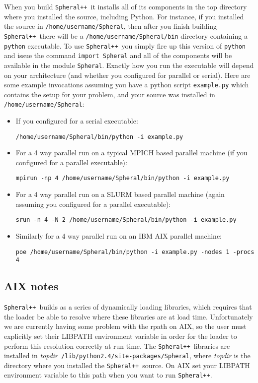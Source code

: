\documentclass{article}
\newcommand{\Spheral}{{\tt Spheral++}}
\begin{document}
When you build \Spheral\ it installs all of its components in the top directory
where you installed the source, including Python.  For instance, if you
installed the source in \verb+/home/username/Spheral+, then after you finish
building \Spheral\ there will be a \verb+/home/username/Spheral/bin+ directory
containing a \verb+python+ executable.  To use \Spheral\ you simply fire up this
version of \verb+python+ and issue the command \verb+import Spheral+ and all of
the components will be available in the module \verb+Spheral+.  Exactly how you
run the executable will depend on your architecture (and whether you configured
for parallel or serial).  Here are some example invocations assuming you have a
python script \verb+example.py+ which contains the setup for your problem, and
your source was installed in {\tt /home/username/Spheral}:
\begin{itemize}
\item If you configured for a serial executable:
\begin{verbatim}
/home/username/Spheral/bin/python -i example.py
\end{verbatim}
\item For a 4 way parallel run on a typical MPICH based parallel machine (if you
configured for a parallel executable):
\begin{verbatim}
mpirun -np 4 /home/username/Spheral/bin/python -i example.py
\end{verbatim}
\item For a 4 way parallel run on a SLURM based parallel machine (again assuming
you configured for a parallel executable):
\begin{verbatim}
srun -n 4 -N 2 /home/username/Spheral/bin/python -i example.py
\end{verbatim}
\item Similarly for a 4 way parallel run on an IBM AIX parallel machine:
\begin{verbatim}
poe /home/username/Spheral/bin/python -i example.py -nodes 1 -procs 4
\end{verbatim}
\end{itemize}

\subsection{AIX notes}
\Spheral\ builds as a series of dynamically loading libraries, which requires
that the loader be able to resolve where these libraries are at load time.
Unfortunately we are currently having some problem with the rpath on AIX, so the
user must explicitly set their LIBPATH environment variable in order for the
loader to perform this resolution correctly at run time.  The
\Spheral\ libraries are installed in {\em topdir}{\tt
  /lib/python2.4/site-packages/Spheral}, where {\em topdir} is the directory
where you installed the \Spheral\ source.  On AIX set your LIBPATH environment
variable to this path when you want to run \Spheral.
\end{document}
